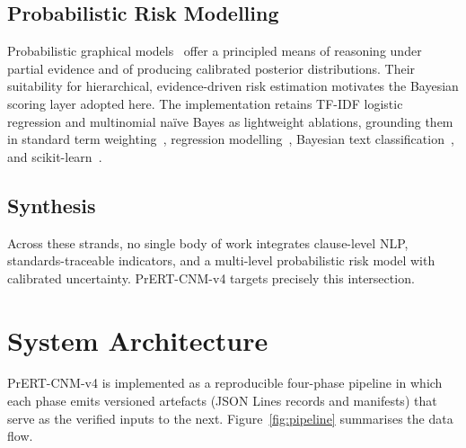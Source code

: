 \documentclass[conference]{IEEEtran}
\begin{document}
\subsection{Probabilistic Risk Modelling}
Probabilistic graphical models~\cite{pearl1988probabilistic,koller2009pgm}
offer a principled means of reasoning under partial evidence and of producing
calibrated posterior distributions. Their suitability for hierarchical,
evidence-driven risk estimation motivates the Bayesian scoring layer adopted
here. The implementation retains TF-IDF logistic regression and multinomial
na\"ive Bayes as lightweight ablations, grounding them in standard term
weighting~\cite{salton1988term}, regression modelling~\cite{cox1958regression},
Bayesian text classification~\cite{domingos1997optimality}, and
scikit-learn~\cite{pedregosa2011scikit}.

\subsection{Synthesis}
Across these strands, no single body of work integrates clause-level NLP,
standards-traceable indicators, and a multi-level probabilistic risk model
with calibrated uncertainty. PrERT-CNM-v4 targets precisely this
intersection.

\section{System Architecture}\label{sec:architecture}
PrERT-CNM-v4 is implemented as a reproducible four-phase pipeline in which
each phase emits versioned artefacts (JSON Lines records and manifests) that
serve as the verified inputs to the next. Figure~\ref{fig:pipeline}
summarises the data flow.
\end{document}
